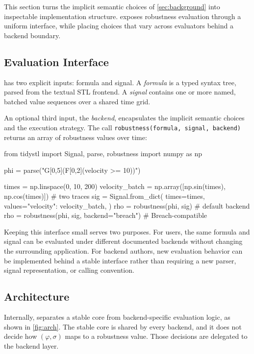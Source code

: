 This section turns the implicit semantic choices of \cref{sec:background} into
inspectable implementation structure. \tool exposes robustness evaluation
through a uniform interface, while placing choices that vary across evaluators
behind a backend boundary.

\subsection{Evaluation Interface}

\tool has two explicit inputs: formula and signal.
A \emph{formula} is a typed syntax tree, parsed from the textual STL frontend.
A \emph{signal} contains one or more named, batched value sequences over a shared time grid.

An optional third input, the \emph{backend}, encapsulates the implicit semantic
choices and the execution strategy. The call
\texttt{robustness(formula, signal, backend)} returns an array of robustness
values over time:

\begin{pycode}
from tidystl import Signal, parse, robustness
import numpy as np

phi = parse("G[0,5](F[0,2](velocity >= 10))")

times = np.linspace(0, 10, 200)
velocity_batch = np.array([np.sin(times), np.cos(times)])  # two traces
sig = Signal.from_dict(
    times=times,
    values={"velocity": velocity_batch},
)
rho = robustness(phi, sig)                    # default backend
rho = robustness(phi, sig, backend="breach")  # Breach-compatible
\end{pycode}

\noindent
Keeping this interface small serves two purposes. For users, the same formula
and signal can be evaluated under different documented backends without
changing the surrounding application. For backend authors, new evaluation
behavior can be implemented behind a stable interface rather than requiring a new parser,
signal representation, or calling convention.

\subsection{Architecture}

Internally, \tool separates a stable core from backend-specific evaluation logic, as shown in \cref{fig:arch}.
The stable core is shared by every backend, and it does not decide how $(\varphi, \sigma)$ maps to a robustness value.
Those decisions are delegated to the backend layer.

